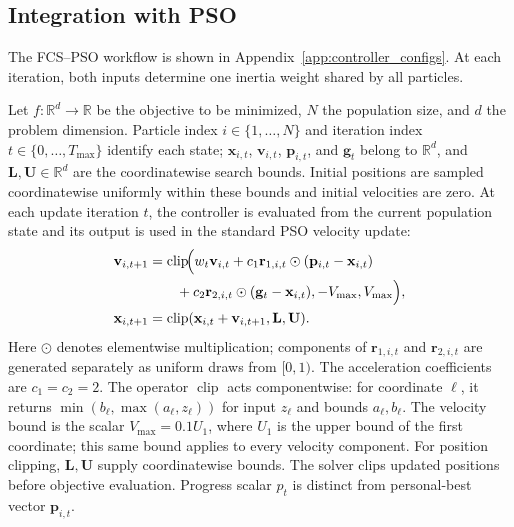 \subsection{Integration with PSO}
\label{subsec:pso_fcs}

The FCS--PSO workflow is shown in Appendix~\ref{app:controller_configs}. At each iteration, both inputs determine one inertia weight shared by all particles.

Let $f:\mathbb{R}^d\to\mathbb{R}$ be the objective to be minimized, $N$ the population size, and $d$ the problem dimension. Particle index $i\in\{1,\ldots,N\}$ and iteration index $t\in\{0,\ldots,T_{\max}\}$ identify each state; $\mathbf{x}_{i,t}$, $\mathbf{v}_{i,t}$, $\mathbf{p}_{i,t}$, and $\mathbf{g}_t$ belong to $\mathbb{R}^d$, and $\mathbf{L},\mathbf{U}\in\mathbb{R}^d$ are the coordinatewise search bounds. Initial positions are sampled coordinatewise uniformly within these bounds and initial velocities are zero. At each update iteration $t$, the controller is evaluated from the current population state and its output is used in the standard PSO velocity update:
\begin{equation}
\begin{aligned}
\mathbf{v}_{i,t+1} &= \operatorname{clip}\!\Bigl(
	w_t\mathbf{v}_{i,t}
	+ c_1\mathbf{r}_{1,i,t}\odot(\mathbf{p}_{i,t}-\mathbf{x}_{i,t})\\
	&\qquad + c_2\mathbf{r}_{2,i,t}\odot(\mathbf{g}_t-\mathbf{x}_{i,t}),
	-V_{\max},V_{\max}\Bigr),\\
\mathbf{x}_{i,t+1} &= \operatorname{clip}(\mathbf{x}_{i,t}+\mathbf{v}_{i,t+1},\mathbf{L},\mathbf{U}).
\end{aligned}
\label{eq:pso_update}
\end{equation}
Here $\odot$ denotes elementwise multiplication; components of $\mathbf{r}_{1,i,t}$ and $\mathbf{r}_{2,i,t}$ are generated separately as uniform draws from $[0,1)$. The acceleration coefficients are $c_1=c_2=2$. The operator $\operatorname{clip}$ acts componentwise: for coordinate $\ell$, it returns $\min(b_\ell,\max(a_\ell,z_\ell))$ for input $z_\ell$ and bounds $a_\ell,b_\ell$. The velocity bound is the scalar $V_{\max}=0.1U_1$, where $U_1$ is the upper bound of the first coordinate; this same bound applies to every velocity component. For position clipping, $\mathbf{L},\mathbf{U}$ supply coordinatewise bounds. The solver clips updated positions before objective evaluation. Progress scalar $p_t$ is distinct from personal-best vector $\mathbf{p}_{i,t}$.

